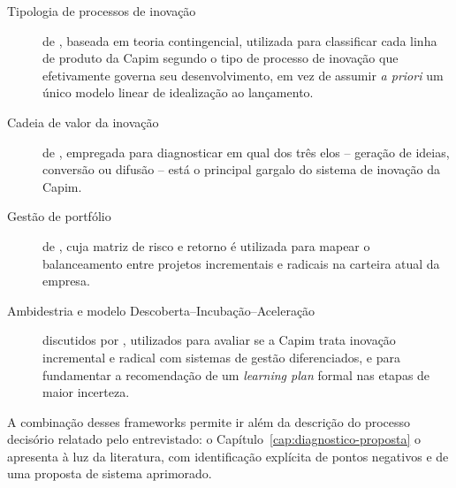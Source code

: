 \begin{description}
  \item[Tipologia de processos de inovação] de \textcite{salerno2015}, baseada em teoria contingencial, utilizada para classificar cada linha de produto da Capim segundo o tipo de processo de inovação que efetivamente governa seu desenvolvimento, em vez de assumir \textit{a priori} um único modelo linear de idealização ao lançamento.
  \item[Cadeia de valor da inovação] de \textcite{hansenbirkinshaw2007}, empregada para diagnosticar em qual dos três elos -- geração de ideias, conversão ou difusão -- está o principal gargalo do sistema de inovação da Capim.
  \item[Gestão de portfólio] de \textcite{goffinmitchell2010}, cuja matriz de risco e retorno é utilizada para mapear o balanceamento entre projetos incrementais e radicais na carteira atual da empresa.
  \item[Ambidestria e modelo Descoberta--Incubação--Aceleração] discutidos por \textcite{salernogomes2018}, utilizados para avaliar se a Capim trata inovação incremental e radical com sistemas de gestão diferenciados, e para fundamentar a recomendação de um \textit{learning plan} formal \cite{riceoconnorpierantozzi2008} nas etapas de maior incerteza.
\end{description}

A combinação desses frameworks permite ir além da descrição do processo decisório relatado pelo entrevistado: o Capítulo~\ref{cap:diagnostico-proposta} o apresenta à luz da literatura, com identificação explícita de pontos negativos e de uma proposta de sistema aprimorado.
